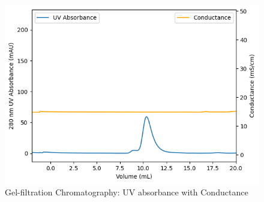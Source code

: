 \documentclass{report}
\begin{document}
\begin{figure}
    \centering
    \includegraphics[width=0.6\linewidth]{../Figures/Filtration Column UV and Conductance.png}
    \caption{Gel-filtration Chromatography: UV absorbance with Conductance}
    \label{Gel-filtration Chromatography: UV absorbance with Conductace}
\end{figure}
\end{document}
